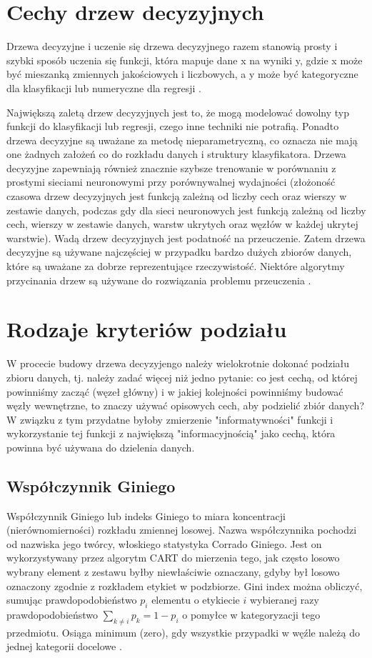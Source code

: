 \documentclass[10pt,a4paper]{article}
\begin{document}
\section{Cechy drzew decyzyjnych}
Drzewa decyzyjne i uczenie się drzewa decyzyjnego razem stanowią prosty i szybki sposób uczenia się funkcji, która mapuje dane x na wyniki y, gdzie x może być mieszanką zmiennych jakościowych i liczbowych, a y może być kategoryczne dla klasyfikacji lub numeryczne dla regresji \cite{Breiman1984}.\par
\vskip 0.2in
Największą zaletą drzew decyzyjnych jest to, że mogą modelować dowolny typ funkcji do klasyfikacji lub regresji, czego inne techniki nie potrafią. Ponadto drzewa decyzyjne są uważane za metodę nieparametryczną, co oznacza nie mają one żadnych założeń co do rozkładu danych i struktury klasyfikatora. Drzewa decyzyjne zapewniają również znacznie szybsze trenowanie w porównaniu z prostymi sieciami neuronowymi przy porównywalnej wydajności (złożoność czasowa drzew decyzyjnych jest funkcją zależną od liczby cech oraz wierszy w zestawie danych, podczas gdy dla sieci neuronowych jest funkcją zależną od liczby cech, wierszy w zestawie danych, warstw ukrytych oraz węzłów w każdej ukrytej warstwie). Wadą drzew decyzyjnych jest podatność na przeuczenie. Zatem drzewa decyzyjne są używane najczęściej w przypadku bardzo dużych zbiorów danych, które są uważane za dobrze reprezentujące rzeczywistość. Niektóre algorytmy przycinania drzew są używane do rozwiązania problemu przeuczenia \cite{MazumdarWWW, Breiman1984, AnalyticsWWW, Lan2017}.

\section{Rodzaje kryteriów podziału}
W procecie budowy drzewa decyzyjengo należy wielokrotnie dokonać podziału zbioru danych, tj. należy zadać więcej niż jedno pytanie: co jest cechą, od której powinniśmy zacząć (węzeł główny) i w jakiej kolejności powinniśmy budować węzły wewnętrzne, to znaczy używać opisowych cech, aby podzielić zbiór danych? W związku z tym przydatne byłoby zmierzenie "informatywności" funkcji i wykorzystanie tej funkcji z największą "informacyjnością" jako cechą, która powinna być używana do dzielenia danych. 

\subsection{Współczynnik Giniego}
Współczynnik Giniego lub indeks Giniego to miara koncentracji (nierównomierności) rozkładu zmiennej losowej. Nazwa współczynnika pochodzi od nazwiska jego twórcy, włoskiego statystyka Corrado Giniego. Jest on wykorzystywany przez algorytm CART do mierzenia tego, jak często losowo wybrany element z zestawu byłby niewłaściwie oznaczany, gdyby był losowo oznaczony zgodnie z rozkładem etykiet w podzbiorze. Gini index można obliczyć, sumując prawdopodobieństwo $p_{i}$ elementu o etykiecie $i$ wybieranej razy prawdopodobieństwo 
$\sum_{k \neq i} p_{k} = 1-p_{i}$ o pomyłce w kategoryzacji tego przedmiotu. Osiąga minimum (zero), gdy wszystkie przypadki w węźle należą do jednej kategorii docelowe \cite{AnalyticsWWW, AIspaceWWW}.
\end{document}
